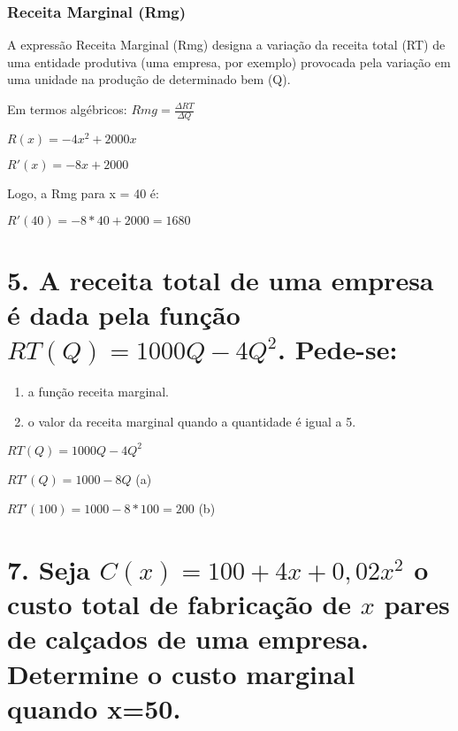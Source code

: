 \hypertarget{receita-marginal-rmg}{%
\subsubsection{Receita Marginal (Rmg)}\label{receita-marginal-rmg}}

A expressão Receita Marginal (Rmg) designa a variação da receita total
(RT) de uma entidade produtiva (uma empresa, por exemplo) provocada pela
variação em uma unidade na produção de determinado bem (Q).

Em termos algébricos: \(Rmg=\frac{ΔRT}{ΔQ}\)

\(R(x)= -4x^2+2000x\)

\(R'(x)=-8x+2000\)

Logo, a Rmg para x = 40 é:

\(R'(40)=-8*40+2000=1680\)

\hypertarget{a-receita-total-de-uma-empresa-uxe9-dada-pela-funuxe7uxe3o-rtq1000q-4q2.-pede-se}{%
\section{\texorpdfstring{5. A receita total de uma empresa é dada pela
função \(RT(Q)=1000Q-4Q^2\).
Pede-se:}{5. A receita total de uma empresa é dada pela função RT(Q)=1000Q-4Q\^{}2. Pede-se:}}\label{a-receita-total-de-uma-empresa-uxe9-dada-pela-funuxe7uxe3o-rtq1000q-4q2.-pede-se}}

\begin{enumerate}
\def\labelenumi{(\alph{enumi})}
\item
  a função receita marginal.
\item
  o valor da receita marginal quando a quantidade é igual a 5.
\end{enumerate}

\(RT(Q)=1000Q-4Q^2\)

\(RT'(Q)=1000-8Q\) (a)

\(RT'(100)=1000-8*100=200\) (b)

\hypertarget{seja-cx-1004x002x2-o-custo-total-de-fabricauxe7uxe3o-de-x-pares-de-caluxe7ados-de-uma-empresa.-determine-o-custo-marginal-quando-x50.}{%
\section{\texorpdfstring{7. Seja \(C(x) = 100+4x+0,02x^2\) o custo total
de fabricação de \(x\) pares de calçados de uma empresa. Determine o
custo marginal quando
x=50.}{7. Seja C(x) = 100+4x+0,02x\^{}2 o custo total de fabricação de x pares de calçados de uma empresa. Determine o custo marginal quando x=50.}}\label{seja-cx-1004x002x2-o-custo-total-de-fabricauxe7uxe3o-de-x-pares-de-caluxe7ados-de-uma-empresa.-determine-o-custo-marginal-quando-x50.}}

